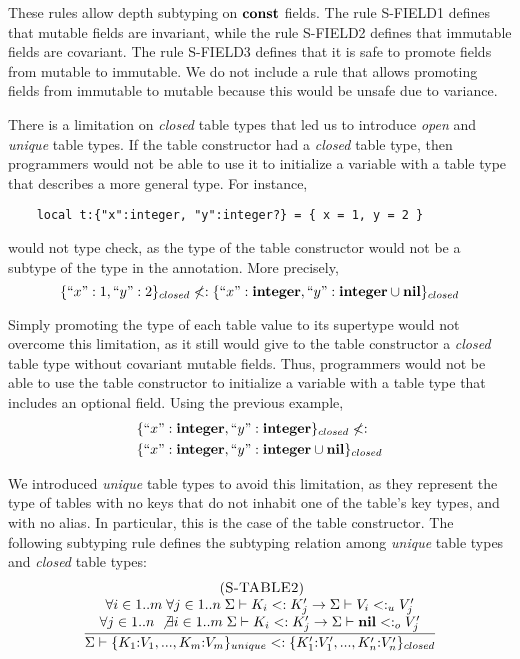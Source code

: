 These rules allow depth subtyping on $\mathbf{const}$ fields.
The rule \textsc{S-FIELD1} defines that mutable fields are invariant,
while the rule \textsc{S-FIELD2} defines that immutable fields are covariant.
The rule \textsc{S-FIELD3} defines that it is safe to promote fields
from mutable to immutable.
We do not include a rule that allows promoting fields from immutable
to mutable because this would be unsafe due to variance.

There is a limitation on \emph{closed} table types that led us to
introduce \emph{open} and \emph{unique} table types.
If the table constructor had a \emph{closed} table type, then
programmers would not be able to use it to initialize a variable with
a table type that describes a more general type.
For instance,
\begin{verbatim}
    local t:{"x":integer, "y":integer?} = { x = 1, y = 2 }
\end{verbatim}
would not type check, as the type of the table constructor would not
be a subtype of the type in the annotation.
More precisely,
\[
\{``x":1, ``y":2\}_{closed} \not<:
\{``x":\mathbf{integer}, ``y":\mathbf{integer} \cup \mathbf{nil}\}_{closed}
\]

Simply promoting the type of each table value to its supertype would
not overcome this limitation, as it still would give to the table constructor
a \emph{closed} table type without covariant mutable fields.
Thus, programmers would not be able to use the table constructor to
initialize a variable with a table type that includes an optional field.
Using the previous example,
\begin{align*}
& \{``x":\mathbf{integer}, ``y":\mathbf{integer}\}_{closed} \not<: \\
& \{``x":\mathbf{integer}, ``y":\mathbf{integer} \cup \mathbf{nil}\}_{closed}
\end{align*}

We introduced \emph{unique} table types to avoid this limitation,
as they represent the type of tables with no keys that do not
inhabit one of the table's key types, and with no alias.
In particular, this is the case of the table constructor.
The following subtyping rule defines the subtyping relation among
\emph{unique} table types and \emph{closed} table types:
\[
\begin{array}{c}
\; (\textsc{S-TABLE2})\\
\dfrac{\begin{array}{c}
       \forall i \in 1..m \; \forall j \in 1..n \;
       \Sigma \vdash K_{i} <: K_{j}' \to \Sigma \vdash V_{i} <:_{u} V_{j}' \\
       \forall j \in 1..n \; \not\exists i \in 1..m \;
       \Sigma \vdash K_{i} <: K_{j}' \to \Sigma \vdash \mathbf{nil} <:_{o} V_{j}'
       \end{array}}
      {\Sigma \vdash \{K_{1}{:}V_{1}, ..., K_{m}{:}V_{m}\}_{unique} <:
                    \{K_{1}'{:}V_{1}', ..., K_{n}'{:}V_{n}'\}_{closed}}
\end{array}
\]

